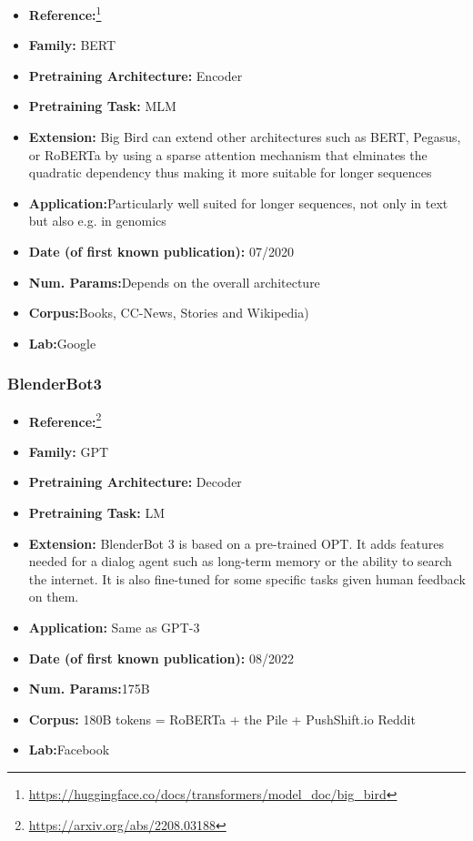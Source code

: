 \documentclass{article}
\begin{document}
            \begin{itemize}
                \item \textbf{Reference:}\footnote{\url{https://huggingface.co/docs/transformers/model_doc/big_bird}}\cite{zaheer2020big}
                \item \textbf{Family:} BERT 
                \item \textbf{Pretraining Architecture:} Encoder
                \item \textbf{Pretraining Task:} MLM
                \item \textbf{Extension:} Big Bird can extend other architectures such as BERT, Pegasus, or RoBERTa by using a sparse attention mechanism that elminates the quadratic dependency thus making it more suitable for longer sequences 
                \item \textbf{Application:}Particularly well suited for longer sequences, not only in text but also e.g. in genomics
                \item \textbf{Date (of first known publication):} 07/2020
                \item \textbf{Num. Params:}Depends on the overall architecture
                \item \textbf{Corpus:}Books, CC-News, Stories and Wikipedia)
                \item \textbf{Lab:}Google
            \end{itemize}

\subsubsection{BlenderBot3}

            \begin{itemize}
                \item \textbf{Reference:}\footnote{\url{https://arxiv.org/abs/2208.03188}}\cite{shuster2022blenderbot}
                \item \textbf{Family:} GPT 
                \item \textbf{Pretraining Architecture:} Decoder
                \item \textbf{Pretraining Task:} LM
                \item \textbf{Extension:} BlenderBot 3 is based on a pre-trained OPT. It adds features needed for a dialog agent such as long-term memory or the ability to search the internet. It is also fine-tuned for some specific tasks given human feedback on them.  
                \item \textbf{Application:} Same as GPT-3
                \item \textbf{Date (of first known publication):} 08/2022
                \item \textbf{Num. Params:}175B
                \item \textbf{Corpus:} 180B tokens = RoBERTa + the Pile + PushShift.io Reddit
                \item \textbf{Lab:}Facebook
            \end{itemize}
\end{document}
